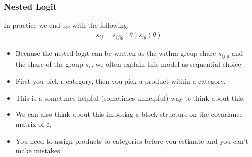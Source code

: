 \begin{frame}
\frametitle{Nested Logit}
In practice we end up with the following:
\begin{eqnarray*}
s_{ij} = s_{ij|g}(\theta) s_{ig}(\theta)
\end{eqnarray*}
\vspace{-0.5cm}
\begin{itemize}
\item Because the nested logit can be written as the within group share $s_{ij|g}$ and the share of the group $s_{ig}$ we often explain this model as \alert{sequential choice}
\item First you pick a category, then you pick a product within a category.
\item This is a sometimes helpful (sometimes unhelpful) way to think about this.
\item We can also think about this imposing a block structure on the covariance matrix of $\varepsilon_i$
\item You need to assign products to categories \alert{before you estimate} and you can't make mistakes!
\end{itemize}
\end{frame}


